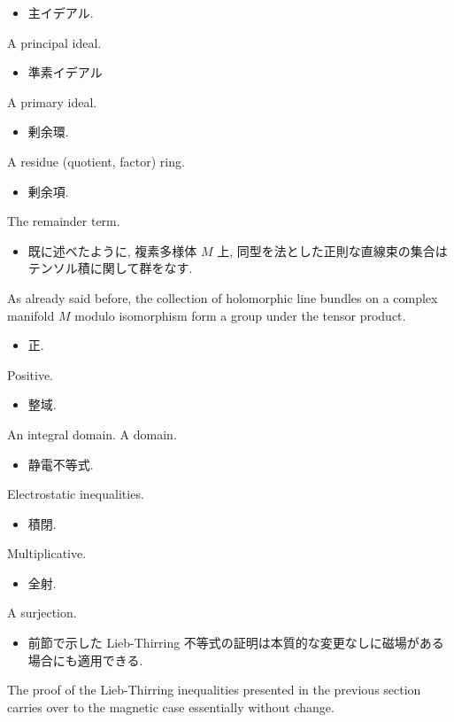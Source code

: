 \documentclass[openany, a4paper, oneside]{jsbook}
\begin{document}
\begin{itemize}
\item 主イデアル.
\end{itemize}
A principal ideal.

\begin{itemize}
\item 準素イデアル
\end{itemize}
A primary ideal.

\begin{itemize}
\item 剰余環.
\end{itemize}
A residue (quotient, factor) ring.

\begin{itemize}
\item 剰余項.
\end{itemize}
The remainder term.

\begin{itemize}
\item 既に述べたように, 複素多様体 $M$ 上, 同型を法とした正則な直線束の集合はテンソル積に関して群をなす. \cite{ChrisPeters1}
\end{itemize}
As already said before, the collection of holomorphic line bundles on a complex manifold
$M$ modulo isomorphism form a group under the tensor product.

\begin{itemize}
\item 正.
\end{itemize}
Positive.

\begin{itemize}
\item 整域.
\end{itemize}
An integral domain. A domain.

\begin{itemize}
\item 静電不等式. \cite{LiebSeiringer1}
\end{itemize}
Electrostatic inequalities.

\begin{itemize}
\item 積閉.
\end{itemize}
Multiplicative.

\begin{itemize}
\item 全射.
\end{itemize}
A surjection.

\begin{itemize}
\item 前節で示した Lieb-Thirring 不等式の証明は本質的な変更なしに磁場がある場合にも適用できる. \cite{LiebSeiringer1}
\end{itemize}
The proof of the Lieb-Thirring inequalities presented in the previous section
carries over to the magnetic case essentially without change.
\end{document}
